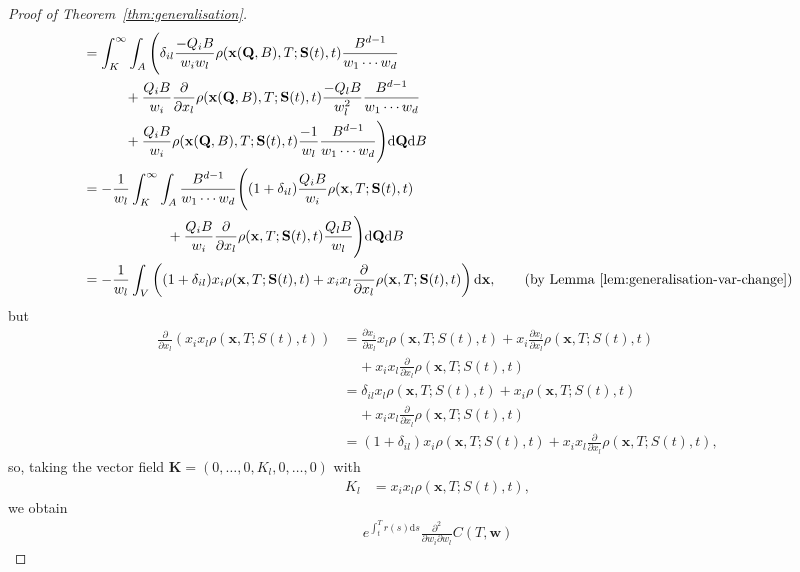 \documentclass[english]{article}
\numberwithin{equation}{section}
\numberwithin{figure}{section}
\theoremstyle{bolddescit}
\theoremstyle{definition}
\theoremstyle{definition}
\theoremstyle{plain}
\theoremstyle{plain}
\theoremstyle{bolddesc}
\theoremstyle{plain}
\theoremstyle{remark}
\begin{document}
\begin{proof}[Proof of Theorem~\ref{thm:generalisation}]
\begin{align*}
    &= \int_K^\infty \int_A \Bigg(
      \delta_{il} \frac{- Q_i B}{w_i w_l} \rho(\mathbf{x}(\mathbf{Q},B),T;\mathbf{S}(t),t) \frac{B^{d-1}}{w_1 \cdots w_d}\\
      &\ \ \ \ \ \ \ \ \ + \frac{Q_i B}{w_i} \frac{\partial}{\partial x_l} \rho(\mathbf{x}(\mathbf{Q},B),T;\mathbf{S}(t),t) \frac{- Q_l B}{w_l^2} \frac{B^{d-1}}{w_1 \cdots w_d}\\
      &\ \ \ \ \ \ \ \ \ + \frac{Q_i B}{w_i} \rho(\mathbf{x}(\mathbf{Q},B),T;\mathbf{S}(t),t) \frac{-1}{w_l} \frac{B^{d-1}}{w_1 \cdots w_d}
    \Bigg) \mathrm{d}\mathbf{Q} \mathrm{d}B\\
    &= -\frac{1}{w_l} \int_K^\infty \int_A \frac{B^{d-1}}{w_1 \cdots w_d} \Bigg(
      (1 + \delta_{il}) \frac{Q_i B}{w_i} \rho(\mathbf{x},T;\mathbf{S}(t),t)\\
      &\ \ \ \ \ \ \ \ \ \ \ \ \ \ \ \ \ \ + \frac{Q_i B}{w_i} \frac{\partial}{\partial x_l} \rho(\mathbf{x},T;\mathbf{S}(t),t) \frac{Q_l B}{w_l} \Bigg) \mathrm{d}\mathbf{Q} \mathrm{d}B\\
    &= -\frac{1}{w_l} \int_V \left( (1 + \delta_{il}) x_i \rho(\mathbf{x},T;\mathbf{S}(t),t)
      + x_i x_l \frac{\partial}{\partial x_l} \rho(\mathbf{x},T;\mathbf{S}(t),t) \right) \mathrm{d}\mathbf{x}, \tag{by Lemma~\ref{lem:generalisation-var-change}}
  \end{align*}
  but
  \begin{align*}
    \frac{\partial}{\partial x_l} \left(x_i x_l \rho(\mathbf{x},T;S(t),t)\right)
    &= \frac{\partial x_i}{\partial x_l} x_l \rho(\mathbf{x},T;S(t),t)
    + x_i \frac{\partial x_l}{\partial x_l} \rho(\mathbf{x},T;S(t),t)\\
    &\ \ \ \ \ + x_i x_l \frac{\partial}{\partial x_l} \rho(\mathbf{x},T;S(t),t)\\
    &= \delta_{il} x_l \rho(\mathbf{x},T;S(t),t) + x_i \rho(\mathbf{x},T;S(t),t)\\
    &\ \ \ \ \ + x_i x_l \frac{\partial}{\partial x_l} \rho(\mathbf{x},T;S(t),t)\\
    &= (1 + \delta_{il}) x_i \rho(\mathbf{x},T;S(t),t) + x_i x_l \frac{\partial}{\partial x_l} \rho(\mathbf{x},T;S(t),t),
  \end{align*}
  so, taking the vector field $\mathbf{K} = (0,\ldots,0,K_l,0,\ldots,0)$ with
  \begin{align*}
    K_l &= x_i x_l \rho(\mathbf{x},T;S(t),t),
  \end{align*}
  we obtain
  \begin{align*}
    e^{\int_t^T r(s) \mathrm{d}s} \frac{\partial^2}{\partial w_i \partial w_l} C(T,\mathbf{w})

\end{align*}
\end{proof}
\end{document}
